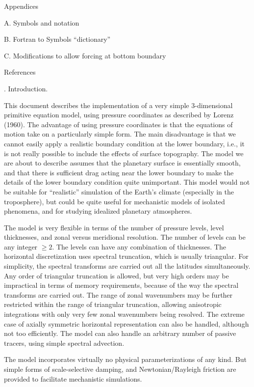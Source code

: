 \medskip Appendices \medskip
 
\item{A.} Symbols and notation
\item{B.} Fortran to Symbols ``dictionary''
\item{C.} Modifications to allow forcing at bottom boundary
 
\medskip References \bigskip
 
 
. Introduction.
 
This document describes the implementation of a very simple 3-dimensional
primitive equation model, using pressure coordinates as described by Lorenz
(1960). The advantage of using pressure coordinates is that the equations of
motion take on a particularly simple form. The main disadvantage is that we
cannot easily apply a realistic boundary condition at the lower boundary,
i.e., it is not really possible to include the effects of surface topography.
The model we are about to describe assumes that the planetary surface is
essentially smooth, and that there is sufficient drag acting near the lower
boundary to make the details of the lower boundary condition quite
unimportant. This model would not be suitable for ``realistic'' simulation of
the Earth's climate (especially in the troposphere), but could be quite useful
for mechanistic models of isolated phenomena, and for studying idealized
planetary atmospheres.
 
The model is very flexible in terms of the number of pressure levels, level
thicknesses, and zonal versus meridional resolution. The number of levels can
be any integer $\ge 2$. The levels can have any combination of thicknesses.
The horizontal discretization uses spectral truncation, which is usually
triangular. For simplicity, the spectral transforms are carried out all the
latitudes simultaneously. Any order of triangular truncation is allowed, but
very high orders may be impractical in terms of memory requirements, because
of the way the spectral transforms are carried out. The range of zonal
wavenumbers may be further restricted within the range of triangular
truncation, allowing anisotropic integrations with only very few zonal
wavenumbers being resolved. The extreme case of axially symmetric horizontal
representation can also be handled, although not too efficiently. The model
can also handle an arbitrary number of passive tracers, using simple spectral
advection.
 
The model incorporates virtually no physical parameterizations of any kind.
But simple forms of scale-selective damping, and Newtonian/Rayleigh friction
are provided to facilitate mechanistic simulations.
 
